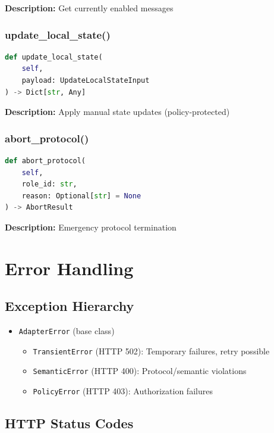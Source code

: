 \documentclass[11pt,a4paper]{article}
\begin{document}
\textbf{Description:} Get currently enabled messages

\subsubsection{update\_local\_state()}

\begin{lstlisting}[language=Python]
def update_local_state(
    self,
    payload: UpdateLocalStateInput
) -> Dict[str, Any]
\end{lstlisting}

\textbf{Description:} Apply manual state updates (policy-protected)

\subsubsection{abort\_protocol()}

\begin{lstlisting}[language=Python]
def abort_protocol(
    self,
    role_id: str,
    reason: Optional[str] = None
) -> AbortResult
\end{lstlisting}

\textbf{Description:} Emergency protocol termination

\section{Error Handling}

\subsection{Exception Hierarchy}

\begin{itemize}
    \item \texttt{AdapterError} (base class)
    \begin{itemize}
        \item \texttt{TransientError} (HTTP 502): Temporary failures, retry possible
        \item \texttt{SemanticError} (HTTP 400): Protocol/semantic violations
        \item \texttt{PolicyError} (HTTP 403): Authorization failures
    \end{itemize}
\end{itemize}

\subsection{HTTP Status Codes}
\end{document}

